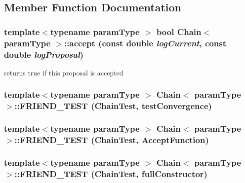 \subsection{Member Function Documentation}
\hypertarget{classChain_a64914a49d1beaea22ef0b3f6464dde8e}{
\subsubsection[{accept}]{\setlength{\rightskip}{0pt plus 5cm}template$<$typename paramType $>$ bool {\bf Chain}$<$ paramType $>$::accept (const double {\em logCurrent}, \/  const double {\em logProposal})}}
\label{classChain_a64914a49d1beaea22ef0b3f6464dde8e}
returns true if this proposal is accepted \hypertarget{classChain_a35c0fda2749e3cfa99a51bb7488e1849}{
\subsubsection[{FRIEND\_\-TEST}]{\setlength{\rightskip}{0pt plus 5cm}template$<$typename paramType $>$ {\bf Chain}$<$ paramType $>$::FRIEND\_\-TEST ({\bf ChainTest}, \/  testConvergence)}}
\label{classChain_a35c0fda2749e3cfa99a51bb7488e1849}
\hypertarget{classChain_ae504fe7678e62b1ee82aff0ebca3e02b}{
\subsubsection[{FRIEND\_\-TEST}]{\setlength{\rightskip}{0pt plus 5cm}template$<$typename paramType $>$ {\bf Chain}$<$ paramType $>$::FRIEND\_\-TEST ({\bf ChainTest}, \/  AcceptFunction)}}
\label{classChain_ae504fe7678e62b1ee82aff0ebca3e02b}
\hypertarget{classChain_ae738aa544270ab0d3c8e3b03872e1cd0}{
\subsubsection[{FRIEND\_\-TEST}]{\setlength{\rightskip}{0pt plus 5cm}template$<$typename paramType $>$ {\bf Chain}$<$ paramType $>$::FRIEND\_\-TEST ({\bf ChainTest}, \/  fullConstructor)}}
